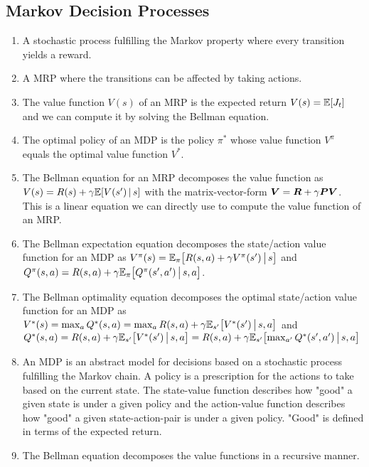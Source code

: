 		\subsection{Markov Decision Processes}
			\begin{enumerate}
				\item A stochastic process fulfilling the Markov property where every transition yields a reward.
				\item A \ac{MRP} where the transitions can be affected by taking actions.
				\item The value function \(V(s)\) of an \ac{MRP} is the expected return \( V(s) = \mathbb{E}[J_t] \) and we can compute it by solving the Bellman equation.
				\item The optimal policy of an \ac{MDP} is the policy \(\pi^\ast\) whose value function \(V^\pi\) equals the optimal value function \(V^\ast\).
				\item The Bellman equation for an \ac{MRP} decomposes the value function as \( V(s) = R(s) + \gamma \mathbb{E}[V(s') \,\vert\, s] \) with the matrix-vector-form \( \bm{V} = \bm{R} + \gamma \bm{P} \bm{V} \). This is a linear equation we can directly use to compute the value function of an \ac{MRP}.
				\item The Bellman expectation equation decomposes the state/action value function for an \ac{MDP} as \( V^\pi(s) = \mathbb{E}_\pi\bigl[ R(s, a) + \gamma V^\pi(s') \,\big\vert\, s \bigr] \) and \( Q^\pi(s, a) = R(s, a) + \gamma \mathbb{E}_\pi\bigl[ Q^\pi(s', a') \,\big\vert\, s, a \bigr] \).
				\item The Bellman optimality equation decomposes the optimal state/action value function for an \ac{MDP} as \( V^\ast(s) = \max_a Q^\ast(s, a) = \max_a R(s, a) + \gamma \mathbb{E}_{s'}\bigl[ V^\ast(s') \,\big\vert\, s, a \bigr] \) and \( Q^\ast(s, a) = R(s, a) + \gamma \mathbb{E}_{s'}\bigl[ V^\ast(s') \,\big\vert\, s, a \bigr] = R(s, a) + \gamma \mathbb{E}_{s'}\bigl[ \max_{a'} Q^\ast(s', a') \,\big\vert\, s, a \bigr] \)
				\item An \ac{MDP} is an abstract model for decisions based on a stochastic process fulfilling the Markov chain. A policy is a prescription for the actions to take based on the current state. The state-value function describes how "good" a given state is under a given policy and the action-value function describes how "good" a given state-action-pair is under a given policy. "Good" is defined in terms of the expected return.
				\item The Bellman equation decomposes the value functions in a recursive manner.
			\end{enumerate}

